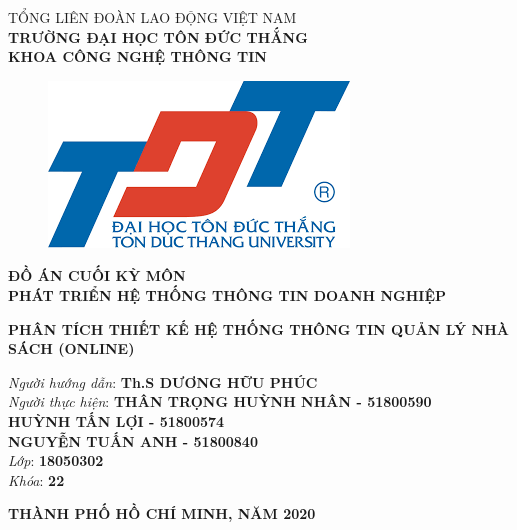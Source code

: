 \documentclass{report}
\begin{document}
\begin{center}
	\fontsize{14}{20}\selectfont
	\textsc{TỔNG LIÊN ĐOÀN LAO ĐỘNG VIỆT NAM\\ 
		\textbf{TRƯỜNG ĐẠI HỌC TÔN ĐỨC THẮNG\\} 
		\textbf{KHOA CÔNG NGHỆ THÔNG TIN}}
	
	\vspace{0.08cm}
	\begin{figure}[htp]
		\begin{center}
			\includegraphics[scale=0.5]{image/logo tdt.png}
		\end{center}
	\end{figure}
	
	\fontsize{15}{20}\selectfont\textbf{ĐỒ ÁN CUỐI KỲ MÔN\\ PHÁT TRIỂN HỆ THỐNG THÔNG TIN DOANH NGHIỆP\\}
	
	\vspace{1.1cm}
	\fontsize{24}{20}\selectfont\textbf{PHÂN TÍCH THIẾT KẾ HỆ THỐNG THÔNG TIN QUẢN LÝ NHÀ SÁCH (ONLINE)}
\end{center}
\vspace{0.5cm}

\begin{flushright}
	\fontsize{14}{20}\selectfont
	\textit{Người hướng dẫn}: \textbf{Th.S DƯƠNG HỮU PHÚC}\\
	\textit{Người thực hiện}:
	\textbf{THÂN TRỌNG HUỲNH NHÂN - 51800590}\\
	\textbf{HUỲNH TẤN LỢI - 51800574}\\
	\textbf{NGUYỄN TUẤN ANH - 51800840}\\
	\textit{Lớp}: \textbf{18050302}\\
	\textit{Khóa}: \textbf{22}\\
\end{flushright}
\vspace{1cm}
\begin{center}
	\fontsize{14}{20}\selectfont
	\textbf{THÀNH PHỐ HỒ CHÍ MINH, NĂM 2020}
\end{center}
\pagebreak
\end{document}

